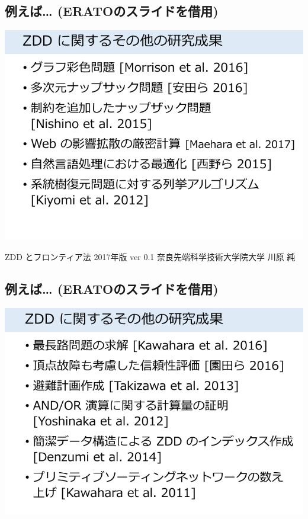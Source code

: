 \subsection{例えば\ldots{} (ERATOのスライドを借用)}
\label{sec-6-3}

\includegraphics{img/static/graph3.png}

\begin{note}
ZDD とフロンティア法 2017年版 ver 0.1 奈良先端科学技術大学院大学 川原 純
\end{note}

\subsection{例えば\ldots{} (ERATOのスライドを借用)}
\label{sec-6-4}

\includegraphics{img/static/graph4.png}

